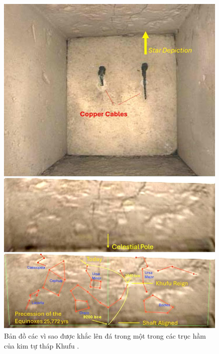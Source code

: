 \documentclass[10pt,twocolumn,letterpaper]{article}
\begin{document}
\begin{figure}[H]
\begin{center}
   \includegraphics[width=1\linewidth]{star-stone.jpg}
\end{center}
   \caption{Bản đồ các vì sao được khắc lên đá trong một trong các trục hầm của kim tự tháp Khufu \cite{28}.}
\label{fig:20}
\label{fig:onecol}
\end{figure}
\end{document}
